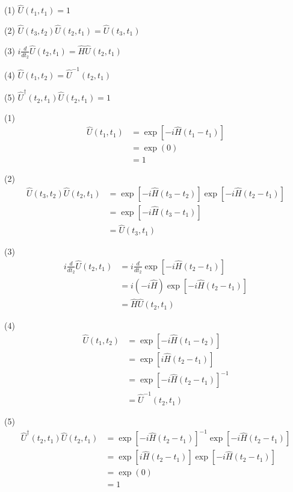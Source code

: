 


\bigskip
(1) $\hat U(t_1,t_1)=1$

(2) $\hat U(t_3,t_2)\hat U(t_2,t_1)=\hat U(t_3,t_1)$

(3) $i\frac{d}{dt_2}\hat U(t_2,t_1)=\hat H\hat U(t_2,t_1)$

(4) $\hat U(t_1,t_2)=\hat U^{-1}(t_2,t_1)$

(5) $\hat U^\dag(t_2,t_1)\hat U(t_2,t_1)=1$

\bigskip
(1)
\begin{align*}
\hat U(t_1,t_1)
&=\exp[-i\hat H(t_1-t_1)]
\\
&=\exp(0)
\\
&=1
\end{align*}

(2)
\begin{align*}
\hat U(t_3,t_2)\hat U(t_2,t_1)
&=\exp[-i\hat H(t_3-t_2)]\exp[-i\hat H(t_2-t_1)]
\\
&=\exp[-i\hat H(t_3-t_1)]
\\
&=\hat U(t_3,t_1)
\end{align*}

(3)
\begin{align*}
i\frac{d}{dt_2}\hat U(t_2,t_1)
&=i\frac{d}{dt_2}\exp[-i\hat H(t_2-t_1)]
\\
&=i(-i\hat H)\exp[-i\hat H(t_2-t_1)]
\\
&=\hat H\hat U(t_2,t_1)
\end{align*}

(4)
\begin{align*}
\hat U(t_1,t_2)
&=\exp[-i\hat H(t_1-t_2)]
\\
&=\exp[i\hat H(t_2-t_1)]
\\
&=\exp[-i\hat H(t_2-t_1)]^{-1}
\\
&=\hat U^{-1}(t_2,t_1)
\end{align*}

(5)
\begin{align*}
\hat U^\dag(t_2,t_1)\hat U(t_2,t_1)
&=\exp[-i\hat H(t_2-t_1)]^{-1}\exp[-i\hat H(t_2-t_1)]
\\
&=\exp[i\hat H(t_2-t_1)]\exp[-i\hat H(t_2-t_1)]
\\
&=\exp(0)
\\
&=1
\end{align*}


